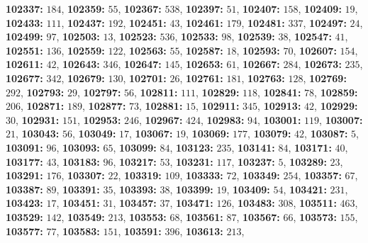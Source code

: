 \textsf{\bfseries 102337:} $184$, \textsf{\bfseries 102359:} $55$, \textsf{\bfseries 102367:} $538$, \textsf{\bfseries 102397:} $51$, \textsf{\bfseries 102407:} $158$, \textsf{\bfseries 102409:} $19$, \textsf{\bfseries 102433:} $111$, \textsf{\bfseries 102437:} $192$, \textsf{\bfseries 102451:} $43$, \textsf{\bfseries 102461:} $179$, \textsf{\bfseries 102481:} $337$, \textsf{\bfseries 102497:} $24$, \textsf{\bfseries 102499:} $97$, \textsf{\bfseries 102503:} $13$, \textsf{\bfseries 102523:} $536$, \textsf{\bfseries 102533:} $98$, \textsf{\bfseries 102539:} $38$, \textsf{\bfseries 102547:} $41$, \textsf{\bfseries 102551:} $136$, \textsf{\bfseries 102559:} $122$, \textsf{\bfseries 102563:} $55$, \textsf{\bfseries 102587:} $18$, \textsf{\bfseries 102593:} $70$, \textsf{\bfseries 102607:} $154$, \textsf{\bfseries 102611:} $42$, \textsf{\bfseries 102643:} $346$, \textsf{\bfseries 102647:} $145$, \textsf{\bfseries 102653:} $61$, \textsf{\bfseries 102667:} $284$, \textsf{\bfseries 102673:} $235$, \textsf{\bfseries 102677:} $342$, \textsf{\bfseries 102679:} $130$, \textsf{\bfseries 102701:} $26$, \textsf{\bfseries 102761:} $181$, \textsf{\bfseries 102763:} $128$, \textsf{\bfseries 102769:} $292$, \textsf{\bfseries 102793:} $29$, \textsf{\bfseries 102797:} $56$, \textsf{\bfseries 102811:} $111$, \textsf{\bfseries 102829:} $118$, \textsf{\bfseries 102841:} $78$, \textsf{\bfseries 102859:} $206$, \textsf{\bfseries 102871:} $189$, \textsf{\bfseries 102877:} $73$, \textsf{\bfseries 102881:} $15$, \textsf{\bfseries 102911:} $345$, \textsf{\bfseries 102913:} $42$, \textsf{\bfseries 102929:} $30$, \textsf{\bfseries 102931:} $151$, \textsf{\bfseries 102953:} $246$, \textsf{\bfseries 102967:} $424$, \textsf{\bfseries 102983:} $94$, \textsf{\bfseries 103001:} $119$, \textsf{\bfseries 103007:} $21$, \textsf{\bfseries 103043:} $56$, \textsf{\bfseries 103049:} $17$, \textsf{\bfseries 103067:} $19$, \textsf{\bfseries 103069:} $177$, \textsf{\bfseries 103079:} $42$, \textsf{\bfseries 103087:} $5$, \textsf{\bfseries 103091:} $96$, \textsf{\bfseries 103093:} $65$, \textsf{\bfseries 103099:} $84$, \textsf{\bfseries 103123:} $235$, \textsf{\bfseries 103141:} $84$, \textsf{\bfseries 103171:} $40$, \textsf{\bfseries 103177:} $43$, \textsf{\bfseries 103183:} $96$, \textsf{\bfseries 103217:} $53$, \textsf{\bfseries 103231:} $117$, \textsf{\bfseries 103237:} $5$, \textsf{\bfseries 103289:} $23$, \textsf{\bfseries 103291:} $176$, \textsf{\bfseries 103307:} $22$, \textsf{\bfseries 103319:} $109$, \textsf{\bfseries 103333:} $72$, \textsf{\bfseries 103349:} $254$, \textsf{\bfseries 103357:} $67$, \textsf{\bfseries 103387:} $89$, \textsf{\bfseries 103391:} $35$, \textsf{\bfseries 103393:} $38$, \textsf{\bfseries 103399:} $19$, \textsf{\bfseries 103409:} $54$, \textsf{\bfseries 103421:} $231$, \textsf{\bfseries 103423:} $17$, \textsf{\bfseries 103451:} $31$, \textsf{\bfseries 103457:} $37$, \textsf{\bfseries 103471:} $126$, \textsf{\bfseries 103483:} $308$, \textsf{\bfseries 103511:} $463$, \textsf{\bfseries 103529:} $142$, \textsf{\bfseries 103549:} $213$, \textsf{\bfseries 103553:} $68$, \textsf{\bfseries 103561:} $87$, \textsf{\bfseries 103567:} $66$, \textsf{\bfseries 103573:} $155$, \textsf{\bfseries 103577:} $77$, \textsf{\bfseries 103583:} $151$, \textsf{\bfseries 103591:} $396$, \textsf{\bfseries 103613:} $213$, 
